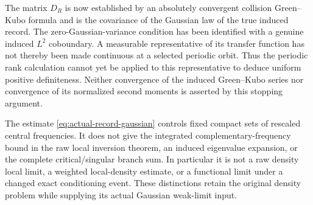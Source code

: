 \begin{remark}
\label{rem:gaussian-versus-raw}
The matrix $D_R$ is now established by an absolutely convergent
collision Green--Kubo formula and is the covariance of the Gaussian
law of the true induced record. The zero-Gaussian-variance condition
has been identified with a genuine induced $L^2$ coboundary. A
measurable representative of its transfer function has not thereby
been made continuous at a selected periodic orbit. Thus the periodic
rank calculation cannot yet be applied to this representative to deduce
uniform positive definiteness. Neither convergence of the induced
Green--Kubo series nor convergence of its normalized second moments is
asserted by this stopping argument.

The estimate \eqref{eq:actual-record-gaussian} controls fixed compact
sets of rescaled central frequencies. It does not give the integrated
complementary-frequency bound in the raw local inversion theorem, an
induced eigenvalue expansion, or the complete critical/singular branch
sum. In particular it is not a raw density local limit, a weighted
local-density estimate, or a functional limit under a changed exact
conditioning event. These distinctions retain the original density
problem while supplying its actual Gaussian weak-limit input.
\end{remark}
